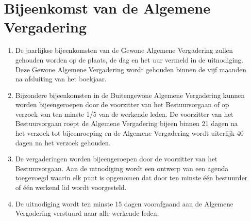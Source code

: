     \section{Bijeenkomst van de Algemene Vergadering}\label{ArtikelBijeenkomstenAV}
    \begin{enumerate}
    \item De jaarlijkse bijeenkomsten van de Gewone Algemene Vergadering zullen gehouden worden op de plaats, de dag en het uur vermeld in de uitnodiging. Deze Gewone Algemene Vergadering wordt gehouden binnen de vijf maanden na afsluiting van het boekjaar.
    \item Bijzondere bijeenkomsten in de Buitengewone Algemene Vergadering kunnen worden bijeengeroepen door de voorzitter van het Bestuursorgaan of op verzoek van ten minste 1/5 van de werkende leden. De voorzitter van het Bestuursorgaan roept de Algemene Vergadering bijeen binnen 21 dagen na het verzoek tot bijeenroeping en de Algemene Vergadering wordt uiterlijk 40 dagen na het verzoek gehouden.
    \item De vergaderingen worden bijeengeroepen door de voorzitter van het Bestuursorgaan. Aan de uitnodiging wordt een ontwerp van een agenda toegevoegd waarin elk punt is opgenomen dat door ten minste één bestuurder of één werkend lid wordt voorgesteld.
    \item De uitnodiging wordt ten minste 15 dagen voorafgaand aan de Algemene Vergadering verstuurd naar alle werkende leden.
    \end{enumerate}
    
